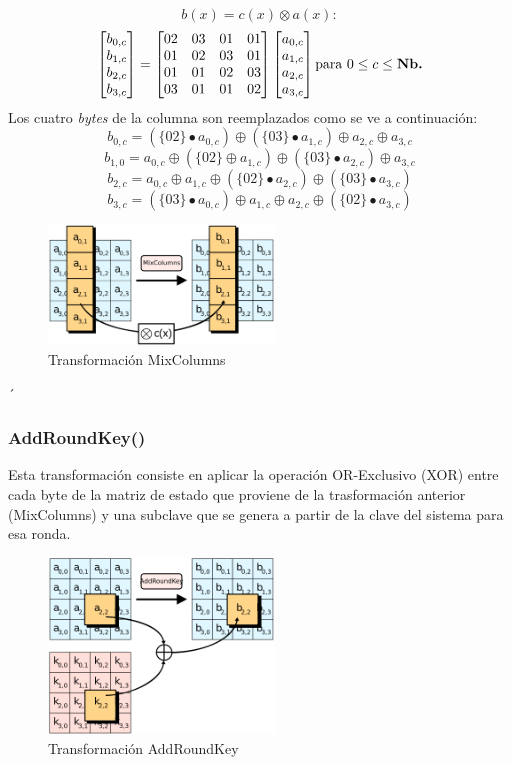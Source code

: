 \documentclass[peerreview]{IEEEtran}
\begin{document}
$$b(x)= c(x)\otimes a(x):$$
$$ \begin{bmatrix}
b_{0, c}\\
b_{1, c}\\
b_{2, c}\\
b_{3, c}\\
\end{bmatrix} = \begin{bmatrix}
02 & 03 & 01 & 01 \\
01 & 02 & 03 & 01 \\
01 & 01 & 02 & 03 \\
03 & 01 & 01 & 02 
\end{bmatrix} \begin{bmatrix}
a_{0, c}\\
a_{1, c}\\
a_{2, c}\\
a_{3, c}\\
\end{bmatrix} \text{para } 0 \leq c \leq \text{\textbf{Nb.}}$$
Los cuatro \textit{bytes} de la columna son reemplazados como se ve a continuación:
$$b_{0, c}=(\{02\}\bullet a_{0, c})\oplus(\{03\}\bullet a_{1, c})\oplus a_{2, c}\oplus a_{3, c}$$
$$b_{1, 0}=a_{0, c}\oplus (\{02\}\oplus a_{1, c})\oplus(\{03\}\bullet a_{2, c})\oplus a_{3, c}$$
$$b_{2, c}= a_{0, c} \oplus a_{1, c} \oplus (\{02\}\bullet a_{2, c})\oplus (\{03\} \bullet a_{3, c})$$
$$b_{3, c}= (\{03 \}\bullet a_{0, c}) \oplus a_{1, c}\oplus a_{2, c} \oplus (\{02\}\bullet a_{3, c})$$
\clearpage
\begin{figure}[ht]
\includegraphics[width=6cm]{figuras/MixColumns.png}
\centering
\caption{Transformación MixColumns}
\label{fig: 5}
\end{figure}´

\subsubsection{AddRoundKey()}
Esta transformación consiste en aplicar la operación OR-Exclusivo (XOR) entre cada byte de la matriz de estado que proviene de la trasformación anterior (MixColumns) y una subclave que se genera a partir de la clave del sistema para esa ronda.
\begin{figure}[ht]
\includegraphics[width=6cm]{figuras/AddRoundKey.png}
\centering
\caption{Transformación AddRoundKey}
\label{fig: 6}
\end{figure}
\end{document}
